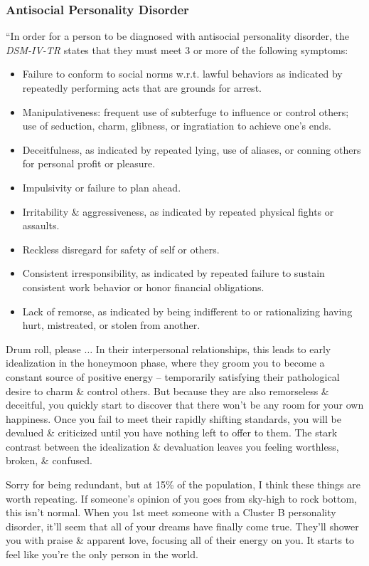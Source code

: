 \documentclass{article}
\numberwithin{equation}{section}
\begin{document}
\subsubsection{Antisocial Personality Disorder}
``In order for a person to be diagnosed with antisocial personality disorder, the \textit{DSM-IV-TR} states that they must meet 3 or more of the following symptoms:
\begin{itemize}
	\item Failure to conform to social norms w.r.t. lawful behaviors as indicated by repeatedly performing acts that are grounds for arrest.
	\item Manipulativeness: frequent use of subterfuge to influence or control others; use of seduction, charm, glibness, or ingratiation to achieve one's ends.
	\item Deceitfulness, as indicated by repeated lying, use of aliases, or conning others for personal profit or pleasure.
	\item Impulsivity or failure to plan ahead.
	\item Irritability \& aggressiveness, as indicated by repeated physical fights or assaults.
	\item Reckless disregard for safety of self or others.
	\item Consistent irresponsibility, as indicated by repeated failure to sustain consistent work behavior or honor financial obligations.
	\item Lack of remorse, as indicated by being indifferent to or rationalizing having hurt, mistreated, or stolen from another.
\end{itemize}
Drum roll, please $\ldots$ In their interpersonal relationships, this leads to early idealization in the honeymoon phase, where they groom you to become a constant source of positive energy -- temporarily satisfying their pathological desire to charm \& control others. But because they are also remorseless \& deceitful, you quickly start to discover that there won't be any room for your own happiness. Once you fail to meet their rapidly shifting standards, you will be devalued \& criticized until you have nothing left to offer to them. The stark contrast between the idealization \& devaluation leaves you feeling worthless, broken, \& confused.

Sorry for being redundant, but at 15\% of the population, I think these things are worth repeating. If someone's opinion of you goes from sky-high to rock bottom, this isn't normal. When you 1st meet someone with a Cluster B personality disorder, it'll seem that all of your dreams have finally come true. They'll shower you with praise \& apparent love, focusing all of their energy on you. It starts to feel like you're the only person in the world.
\end{document}

